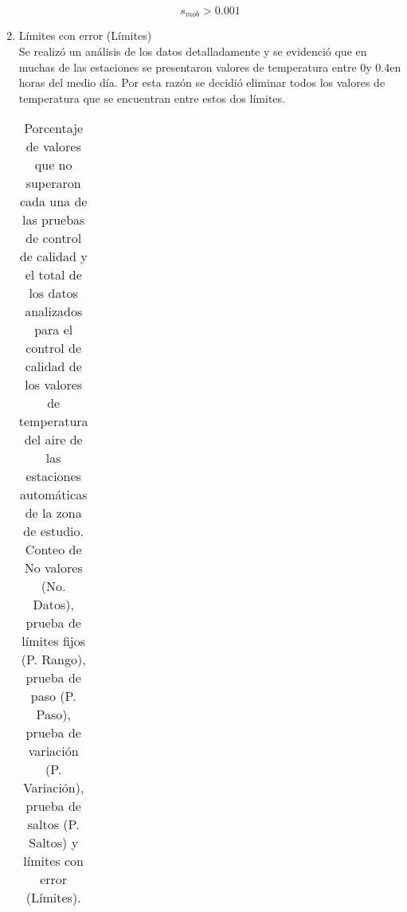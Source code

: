 \begin{enumerate}
\begin{center}
\begin{equation}\label{eq:desv_est}
	s_{mob} > 0.001
\end{equation}
\end{center}

\item Límites con error (Límites)\\

Se realizó un análisis de los datos detalladamente y se evidenció que en muchas de las estaciones se presentaron valores de temperatura entre 0\celc y 0.4\celc en horas del medio día. Por esta razón se decidió eliminar todos los valores de temperatura que se encuentran entre estos dos límites.

\newpage
\begin{landscape}



\begin{longtable}{p{5cm}rrrrrrr}


\caption{Porcentaje de valores que no superaron cada una de las pruebas de control de calidad y el total de los datos analizados para el control de calidad de los valores de temperatura del aire de las estaciones automáticas de la zona de estudio. Conteo de No valores (No. Datos), prueba de límites fijos (P. Rango), prueba de paso (P. Paso), prueba de variación (P. Variación), prueba de saltos (P. Saltos) y límites con error (Límites).}
\label{tab:cc_tmp}\\
\hline


\end{longtable}
\end{landscape}
\end{enumerate}
